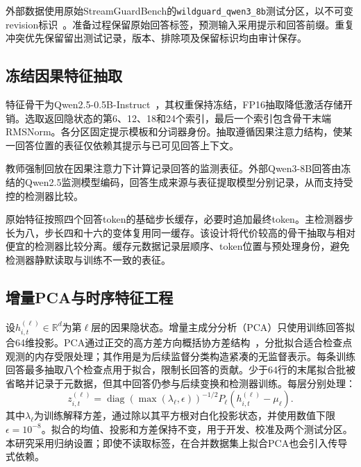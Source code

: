 外部数据使用原始StreamGuardBench的\texttt{wildguard\_qwen3\_8b}测试分区，以不可变revision标识~\cite{streamguardbench2025data}。准备过程保留原始回答标签，预测输入采用提示和回答前缀。重复冲突优先保留留出测试记录，版本、排除项及保留标识均由审计保存。




\subsection{冻结因果特征抽取}
特征骨干为Qwen2.5-0.5B-Instruct~\cite{qwen2024qwen25}，其权重保持冻结，FP16抽取降低激活存储开销。选取返回隐状态的第6、12、18和24个索引，最后一个索引包含骨干末端RMSNorm。各分区固定提示模板和分词器身份。抽取遵循因果注意力结构，使某一回答位置的表征仅依赖其提示与已可见回答上下文。

教师强制回放在因果注意力下计算记录回答的监测表征。外部Qwen3-8B回答由冻结的Qwen2.5监测模型编码，回答生成来源与表征提取模型分别记录，从而支持受控的检测器比较。

原始特征按照四个回答token的基础步长缓存，必要时追加最终token。主检测器步长为八，步长四和十六的变体复用同一缓存。该设计将代价较高的骨干抽取与相对便宜的检测器比较分离。缓存元数据记录层顺序、token位置与预处理身份，避免检测器静默读取与训练不一致的表征。

\subsection{增量PCA与时序特征工程}
设$h^{(\ell)}_{i,t}\in\mathbb R^d$为第$\ell$层的因果隐状态。增量主成分分析（PCA）只使用训练回答拟合64维投影。PCA通过正交的高方差方向概括协方差结构~\cite{jolliffe2016pca}，分批拟合适合检查点观测的内存受限处理；其作用是为后续监督分类构造紧凑的无监督表示。每条训练回答最多抽取八个检查点用于拟合，限制长回答的贡献。少于64行的末尾拟合批被省略并记录于元数据，但其中回答仍参与后续变换和检测器训练。每层分别处理：
\begin{equation*}
 z^{(\ell)}_{i,t}=\operatorname{diag}(\max(\lambda_\ell,\epsilon))^{-1/2}
 P_\ell(h^{(\ell)}_{i,t}-\mu_\ell).
\end{equation*}
其中$\lambda_\ell$为训练解释方差，通过除以其平方根对白化投影状态，并使用数值下限$\epsilon=10^{-8}$。拟合的均值、投影和方差保持不变，用于开发、校准及两个测试分区。本研究采用归纳设置；即使不读取标签，在合并数据集上拟合PCA也会引入传导式依赖。

